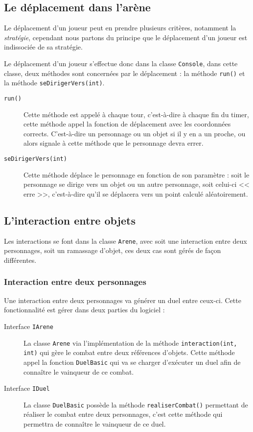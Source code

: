 \documentclass[12pt,a4paper,openany]{book}
\begin{document}
		\subsection{Le déplacement dans l'arène}
		Le déplacement d'un joueur peut en prendre plusieurs critères, notamment la \textit{stratégie}, cependant nous partons du principe que le déplacement
		d'un joueur est indissociée de sa stratégie.

		Le déplacement d'un joueur s'effectue donc dans la classe \texttt{Console}, dans cette classe, deux méthodes sont concernées par le déplacement : la
		méthode \texttt{run()} et la méthode \texttt{seDirigerVers(int)}. 

		\begin{description}
			\item[\texttt{run()}] Cette méthode est appelé à chaque tour, c'est-à-dire à chaque fin du timer, cette méthode appel la fonction de déplacement avec
				les coordonnées corrects. C'est-à-dire un personnage ou un objet si il y en a un proche, ou alors signale à cette méthode que le personnage devra
				errer.
			\item[\texttt{seDirigerVers(int)}] Cette méthode déplace le personnage en fonction de son paramètre : soit le personnage se dirige vers un objet ou
				un autre personnage, soit celui-ci << erre >>, c'est-à-dire qu'il se déplacera vers un point calculé aléatoirement.
		\end{description}

		\subsection{L'interaction entre objets}
		Les interactions se font dans la classe \texttt{Arene}, avec soit une interaction entre deux personnages, soit un ramassage d'objet, ces deux cas sont
		gérés de façon différentes.

		\subsubsection{Interaction entre deux personnages}
		Une interaction entre deux personnages va générer un duel entre ceux-ci. Cette fonctionnalité est gérer dans deux parties du logiciel : 
		\begin{description}
			\item[Interface \texttt{IArene}] La classe \texttt{Arene} via l'implémentation de la méthode \texttt{interaction(int, int)} qui gère le combat entre deux références d'objets. Cette méthode appel la fonction \texttt{DuelBasic} qui va se charger d'exécuter un duel afin de connaître le vainqueur de ce combat.
			\item[Interface \texttt{IDuel}] La classe \texttt{DuelBasic} possède la méthode \texttt{realiserCombat()} permettant de réaliser le combat entre
				deux personnages, c'est cette méthode qui permettra de connaître le vainqueur de ce duel.
		\end{description}
\end{document}
